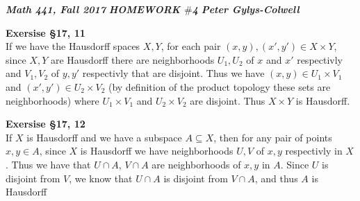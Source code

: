 \documentclass[12pt]{article}
\newenvironment{ques}[1]{\textbf{Exersise #1}\vspace{1 mm}\\ }{\bigskip}
\theoremstyle{definition}
\begin{document}
\noindent \textit{\textbf{Math 441, Fall 2017}} \hspace{1.3cm}
\textit{\textbf{HOMEWORK $\#$4}} \hspace{1.3cm} \textit{\textbf{Peter
Gylys-Colwell}} 

\vspace{1cm}

\begin{ques}{\S 17, 11}
	If we have the Hausdorff spaces $X, Y$, for each pair $(x,y), (x',y') \in X \times
	Y$, since $X, Y$ are Hausdorff there are neighborhoods $U_1, U_2$ of $x$
	and $x'$ respectivly and $V_1, V_2$ of $y, y'$ respectivly that are
	disjoint. Thus we have $(x, y) \in U_1 \times V_1$ and $(x', y') \in U_2
	\times V_2$ (by definition of the product topology these sets are
	neighborhoods) where $U_1 \times V_1$ and $U_2 \times V_2$ are disjoint.
	Thus $X \times Y$ is Hausdorff.
\end{ques}

\begin{ques}{\S 17, 12}
	If $X$ is Hausdorff and we have a subspace $A \subseteq X$, then for any
	pair of points $x, y \in A$, since $X$ is Hausdorff we have neighborhoods
	$U, V$ of $x, y$ respectivly in $X$. Thus we have that $U \cap A$, $V \cap
	A$ are neighborhoods of $x, y$ in $A$. Since $U$ is disjoint from $V$, we
	know that $U \cap A$ is disjoint from $V \cap A$, and thus $A$ is Hausdorff
\end{ques}
\end{document}
